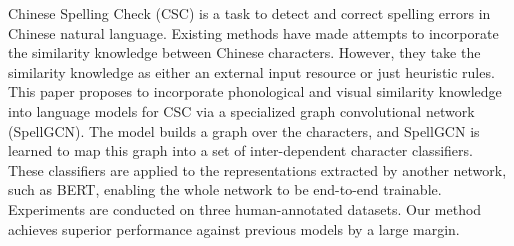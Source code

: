 Chinese Spelling Check (CSC) is a task to detect and correct spelling errors in Chinese natural language. Existing methods have made attempts to incorporate the similarity knowledge between Chinese characters. However, they take the similarity knowledge as either an external input resource or just heuristic rules. This paper proposes to incorporate phonological and visual similarity knowledge into language models for CSC via a specialized graph convolutional network (SpellGCN). The model builds a graph over the characters, and SpellGCN is learned to map this graph into a set of inter-dependent character classifiers. These classifiers are applied to the representations extracted by another network, such as BERT, enabling the whole network to be end-to-end trainable. Experiments are conducted on three human-annotated datasets. Our method achieves superior performance against previous models by a large margin.
